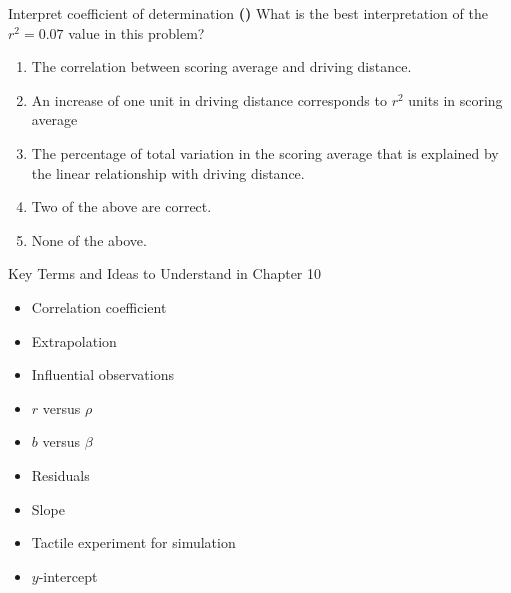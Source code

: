 \documentclass[13pt]{beamer}
\newcounter{count}
\newcommand{\question}{ \textbf{(\decimal{count})} \stepcounter{count}}
\newenvironment{click}{\begin{enumerate}[A]}{\end{enumerate}}
\begin{document}
\begin{frame}{Interpret coefficient of determination}
\question What is the best interpretation of the $r^2 = 0.07$ value in this problem?
\begin{click}
   \item The correlation between scoring average and driving distance.
   \item An increase of one unit in driving distance corresponds to $r^2$ units in scoring average
   \item The percentage of total variation in the scoring average that is explained by the linear relationship with driving distance. %
   \item Two of the above are correct.
   \item None of the above.
\end{click}
\end{frame}


\begin{frame}{Key Terms and Ideas to Understand in Chapter 10}
\begin{itemize}
	\item Correlation coefficient
    \item Extrapolation
    \item Influential observations
    \item $r$ versus $\rho$
    \item $b$ versus $\beta$
    \item Residuals
    \item Slope
    \item Tactile experiment for simulation
    \item $y$-intercept
\end{itemize}
\end{frame}
\end{document}
